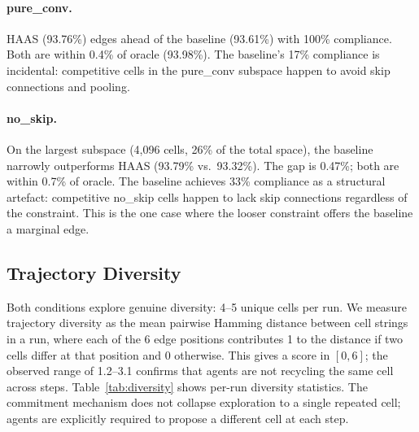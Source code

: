 \documentclass[10pt]{article}
\newcommand{\haas}{\textsc{HAAS}}
\begin{document}
\paragraph{pure\_conv.}
\haas{} (93.76\%) edges ahead of the baseline (93.61\%) with 100\% compliance.
Both are within 0.4\% of oracle (93.98\%). The baseline's 17\% compliance is
incidental: competitive cells in the pure\_conv subspace happen to avoid skip
connections and pooling.

\paragraph{no\_skip.}
On the largest subspace (4,096 cells, 26\% of the total space), the baseline
narrowly outperforms \haas{} (93.79\% vs.\ 93.32\%). The gap is 0.47\%;
both are within 0.7\% of oracle. The baseline achieves 33\% compliance as a
structural artefact: competitive no\_skip cells happen to lack skip connections
regardless of the constraint. This is the one case where the looser constraint
offers the baseline a marginal edge.

\subsection{Trajectory Diversity}
\label{sec:phase2-diversity}

Both conditions explore genuine diversity: 4--5 unique cells per run.
We measure trajectory diversity as the mean pairwise Hamming distance between
cell strings in a run, where each of the 6 edge positions contributes 1 to the
distance if two cells differ at that position and 0 otherwise. This gives a
score in $[0, 6]$; the observed range of 1.2--3.1 confirms that agents are not
recycling the same cell across steps. Table~\ref{tab:diversity} shows per-run diversity
statistics. The commitment mechanism does not collapse exploration to a
single repeated cell; agents are explicitly required to propose a different
cell at each step.
\end{document}

